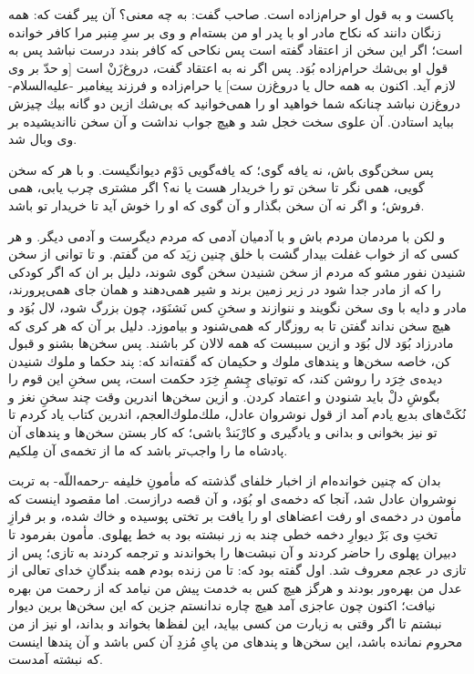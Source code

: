 پاكست و به قول او حرام‌زاده است. صاحب گفت: به چه معنى‌؟ آن پير گفت كه: همه زنگان دانند كه نكاح مادر او با پدر او من بسته‌ام و وى بر سرِ مِنبر مرا كافر خوانده است؛ اگر اين سخن از اعتقاد گفته است پس نكاحى كه كافر بندد درست نباشد پس به قول او بى‌شك حرام‌زاده بُوَد. پس اگر نه به اعتقاد گفت، دروغ‌زَنْ است [و حدّ بر وى لازم آيد. اكنون به همه حال يا دروغ‌زن ست] يا حرام‌زاده و فرزند پيغامبر -عليه‌السلام- دروغ‌زن نباشد چنانكه شما خواهيد او را همى‌خوانيد كه بى‌شك ازين دو گانه بيك چيزش ببايد استادن. آن علوى سخت خجل شد و هيچ جواب نداشت و آن سخن ناانديشيده بر وى وبال شد.

پس سخن‌گوى باش، نه يافه گوى؛ كه يافه‌گويى دَوْم ديوانگيست. و با هر كه سخن گويى، همى نگر تا سخن تو را خريدار هست يا نه‌؟ اگر مشترى چرب يابى، همى فروش؛ و اگر نه آن سخن بگذار و آن گوى كه او را خوش آيد تا خريدار تو باشد.

و لكن با مردمان مردم باش و با آدميان آدمى كه مردم ديگرست و آدمى ديگر. و هر كسى كه از خواب غفلت بيدار گشت با خلق چنين زيَد كه من گفتم. و تا توانى از سخن شنيدن نفور مشو كه مردم از سخن شنيدن سخن گوى شوند، دليل بر ان كه اگر كودكى را كه از مادر جدا شود در زير زمين برند و شير همى‌دهند و همان جاى همى‌پرورند، مادر و دايه با وى سخن نگويند و ننوازند و سخنِ كس نَشنَوَد، چون بزرگ شود، لال بُوَد و هيچ سخن نداند گفتن تا به روزگار كه همى‌شنود و بياموزد. دليل بر آن كه هر كرى كه مادرزاد بُوَد لال بُوَد و ازين سببست كه همه لالان كر باشند. پس سخن‌ها بشنو و قبول كن، خاصه سخن‌ها و پندهاى ملوك و حكيمان كه گفته‌اند كه: پند حكما و ملوك شنيدن ديده‌ی خِرَد را روشن كند، كه توتياى چِشمِ خِرَد حكمت است، پس سخنِ اين قوم را بگوشِ دلْ بايد شنودن و اعتماد كردن. و ازين سخن‌ها اندرين وقت چند سخنِ نغز و نُكَت‌ْهاى بديع يادم آمد از قول نوشروان عادل، ملك‌ملوك‌العجم، اندرين كتاب ياد كردم تا تو نيز بخوانى و بدانى و ياد‌گيرى و كارْبَندْ باشى؛ كه كار بستن سخن‌ها و پندهاى آن پادشاه ما را واجب‌تر باشد كه ما از تخمه‌ی آن مِلكيم.

بدان كه چنين خوانده‌ام از اخبار خلفاى گذشته كه مأمونِ خليفه -رحمه‌اللّه- به تربت نوشروان عادل شد، آنجا كه دخمه‌ی او بُوَد، و آن قصه درازست. اما مقصود اينست كه مأمون در دخمه‌ی او رفت اعضاهاى او را يافت بر تختى پوسيده و خاك شده، و بر فرازِ تختِ وى بَرْ ديوارِ دخمه خطى چند به زر نبشته بود به خط پهلوى. مأمون بفرمود تا دبيران پهلوى را حاضر كردند و آن نبشت‌ها را بخواندند و ترجمه كردند به تازى؛ پس از تازى در عجم معروف شد. اول گفته بود كه: تا من زنده بودم همه بندگانِ خداى تعالى از عدل من بهره‌ور بودند و هرگز هيچ كس به خدمت پيش من نيامد كه از رحمت من بهره نيافت؛ اكنون چون عاجزى آمد هيچ چاره ندانستم جزين كه اين سخن‌ها برين ديوار نبشتم تا اگر وقتى به زيارت من كسى بيايد، اين لفظ‌ها بخواند و بداند، او نيز از من محروم نمانده باشد، اين سخن‌ها و پندهاى من پاىِ مُزدِ آن كس باشد و آن پندها اينست كه نبشته آمدست.


\newpage
